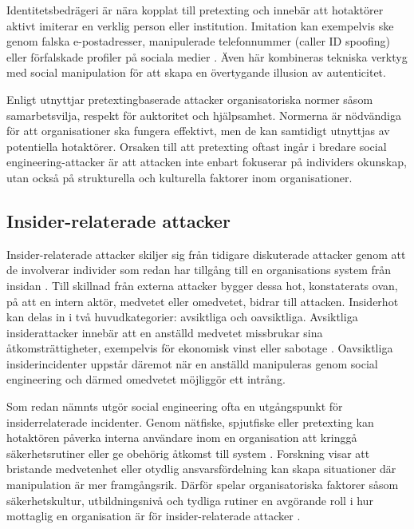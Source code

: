 Identitetsbedrägeri är nära kopplat till pretexting och innebär att hotaktörer aktivt imiterar en verklig person eller institution. Imitation kan exempelvis ske genom falska e-postadresser, manipulerade 
telefonnummer (caller ID spoofing) eller förfalskade profiler på sociala medier \cite{aldawood2019taxonomy}. Även här kombineras tekniska verktyg med social manipulation för att skapa en övertygande illusion av autenticitet. 

Enligt \cite{washo2021interdisciplinary} utnyttjar  pretextingbaserade attacker organisatoriska normer såsom samarbetsvilja, respekt för auktoritet och hjälpsamhet. Normerna är nödvändiga för att 
organisationer ska fungera effektivt, men de kan samtidigt utnyttjas av potentiella hotaktörer. Orsaken till att pretexting oftast ingår i bredare social engineering-attacker är att attacken inte enbart 
fokuserar på individers okunskap, utan också på strukturella och kulturella faktorer inom organisationer.

\subsection{Insider-relaterade attacker}
Insider-relaterade attacker skiljer sig från tidigare diskuterade attacker genom att de involverar individer som redan har tillgång till en organisations system från insidan \cite{algarni2019se_survey}. 
Till skillnad från externa attacker bygger dessa hot, konstaterats ovan, på att en intern aktör, medvetet eller omedvetet, bidrar till attacken. Insiderhot kan delas in i två huvudkategorier: avsiktliga och oavsiktliga. 
Avsiktliga insiderattacker innebär att en anställd medvetet missbrukar sina åtkomsträttigheter, exempelvis för ekonomisk vinst eller sabotage \cite{algarni2024comprehensive_taxonomy, gururaj2024social_engineering}. 
Oavsiktliga insiderincidenter uppstår däremot när en anställd manipuleras genom social engineering och därmed omedvetet möjliggör ett intrång. 

Som redan nämnts utgör social engineering ofta en utgångspunkt för insiderrelaterade incidenter. Genom nätfiske, spjutfiske eller pretexting kan hotaktören påverka interna användare inom en organisation att 
kringgå säkerhetsrutiner eller ge obehörig åtkomst till system \cite{algarni2019se_survey}. Forskning visar att bristande medvetenhet eller otydlig ansvarsfördelning kan skapa situationer där manipulation är mer framgångsrik. 
Därför spelar organisatoriska faktorer såsom säkerhetskultur, utbildningsnivå och tydliga rutiner en avgörande roll i hur mottaglig en organisation är för insider-relaterade attacker \cite{albladi2018defense_mechanisms, enisa2018cybersecurity_culture}.